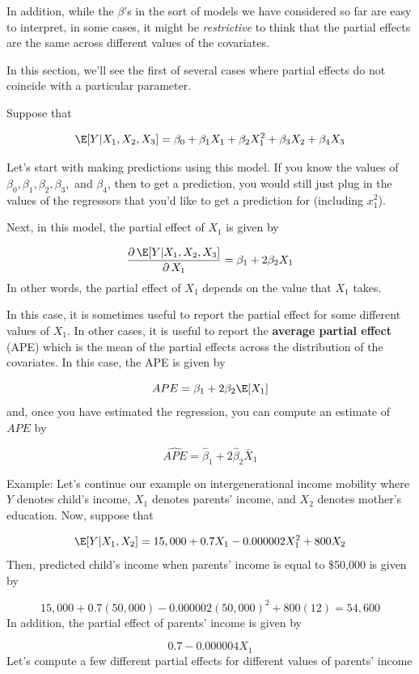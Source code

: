 \documentclass[
  letterpaper,
  DIV=11,
  numbers=noendperiod]{scrreprt}
\begin{document}
In addition, while the \(\beta\)'s in the sort of models we have
considered so far are easy to interpret, in some cases, it might be
\emph{restrictive} to think that the partial effects are the same across
different values of the covariates.

In this section, we'll see the first of several cases where partial
effects do not coincide with a particular parameter.

Suppose that

\[ 
  \E[Y|X_1,X_2,X_3] = \beta_0 + \beta_1 X_1 + \beta_2 X_1^2 + \beta_3 X_2 + \beta_4 X_3
\]

Let's start with making predictions using this model. If you know the
values of \(\beta_0,\beta_1,\beta_2,\beta_3,\) and \(\beta_4\), then to
get a prediction, you would still just plug in the values of the
regressors that you'd like to get a prediction for (including
\(x_1^2\)).

Next, in this model, the partial effect of \(X_1\) is given by

\[
  \frac{\partial \, \E[Y|X_1,X_2,X_3]}{\partial \, X_1} = \beta_1 + 2\beta_2 X_1
\] In other words, the partial effect of \(X_1\) depends on the value
that \(X_1\) takes.

In this case, it is sometimes useful to report the partial effect for
some different values of \(X_1\). In other cases, it is useful to report
the \textbf{average partial effect} (APE) which is the mean of the
partial effects across the distribution of the covariates. In this case,
the APE is given by

\[
  APE = \beta_1 + 2 \beta_2 \E[X_1]
\] and, once you have estimated the regression, you can compute an
estimate of \(APE\) by

\[
  \widehat{APE} = \hat{\beta}_1 + 2 \hat{\beta}_2 \bar{X}_1
\]

{Example: }Let's continue our example on intergenerational income
mobility where \(Y\) denotes child's income, \(X_1\) denotes parents'
income, and \(X_2\) denotes mother's education. Now, suppose that

\[
  \E[Y|X_1,X_2] = 15,000 + 0.7 X_1 - 0.000002 X_1^2 + 800 X_2
\] Then, predicted child's income when parents' income is equal to
\$50,000 is given by

\[
  15,000 + 0.7 (50,000) - 0.000002 (50,000)^2 + 800 (12) = 54,600
\] In addition, the partial effect of parents' income is given by

\[
  0.7 - 0.000004 X_1 
\] Let's compute a few different partial effects for different values of
parents' income
\end{document}
